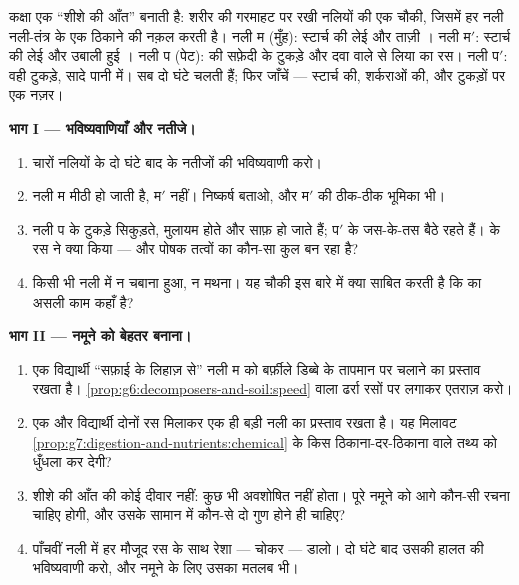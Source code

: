 \begin{problem}[{सप्ताहांत समस्या --- मेज़ पर, नली-दर-नली पाचन
बनाना}]\label{pb:g7:digestion-and-nutrients:1}
कक्षा एक ``शीशे की आँत'' बनाती है: शरीर की गरमाहट पर रखी नलियों की एक
चौकी, जिसमें हर नली नली-तंत्र के एक ठिकाने की नक़ल करती है। नली म
(मुँह): स्टार्च की लेई और ताज़ी । नली म$'$: स्टार्च की लेई और उबाली
हुई । नली प (पेट):  की सफ़ेदी के टुकड़े और दवा वाले से लिया
 का रस। नली प$'$: वही टुकड़े, सादे पानी में। सब दो घंटे चलती हैं;
फिर जाँचें --- स्टार्च की, शर्कराओं की, और टुकड़ों पर एक नज़र।

\medskip\noindent\textbf{भाग I --- भविष्यवाणियाँ और नतीजे।}
\begin{enumerate}
  \item चारों नलियों के दो घंटे बाद के नतीजों की भविष्यवाणी करो।
  \item नली म मीठी हो जाती है, म$'$ नहीं। निष्कर्ष बताओ, और म$'$ की
        ठीक-ठीक भूमिका भी।
  \item नली प के टुकड़े सिकुड़ते, मुलायम होते और साफ़ हो जाते हैं;
        प$'$ के जस-के-तस बैठे रहते हैं।  के रस ने क्या किया ---
        और पोषक तत्वों का कौन-सा कुल बन रहा है?
  \item किसी भी नली में न चबाना हुआ, न मथना। यह चौकी इस बारे में क्या
        साबित करती है कि  का असली काम कहाँ है?
\end{enumerate}

\medskip\noindent\textbf{भाग II --- नमूने को बेहतर बनाना।}
\begin{enumerate}[resume]
  \item एक विद्यार्थी ``सफ़ाई के लिहाज़ से'' नली म को बर्फ़ीले
        डिब्बे के तापमान पर चलाने का प्रस्ताव रखता है।
        \cref{prop:g6:decomposers-and-soil:speed} वाला ढर्रा रसों पर
        लगाकर एतराज़ करो।
  \item एक और विद्यार्थी दोनों रस मिलाकर एक ही बड़ी नली का प्रस्ताव
        रखता है। यह मिलावट
        \cref{prop:g7:digestion-and-nutrients:chemical} के किस
        ठिकाना-दर-ठिकाना वाले तथ्य को धुँधला कर देगी?
  \item शीशे की आँत की कोई दीवार नहीं: कुछ भी अवशोषित नहीं होता। पूरे
        नमूने को आगे कौन-सी रचना चाहिए होगी, और उसके सामान में कौन-से
        दो गुण होने ही चाहिए?
  \item पाँचवीं नली में हर मौजूद रस के साथ रेशा --- चोकर --- डालो।
        दो घंटे बाद उसकी हालत की भविष्यवाणी करो, और नमूने के लिए
        उसका मतलब भी।
\end{enumerate}


\end{problem}
